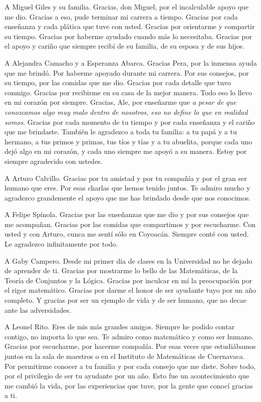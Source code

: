 A Miguel Giles y su familia. Gracias, don Miguel, por el incalculable apoyo que me dio. Gracias a eso, pude terminar mi carrera a tiempo. Gracias por cada enseñanza y cada plática que tuve con usted. Gracias por orientarme y compartir su tiempo. Gracias por haberme ayudado cuando más lo necesitaba. Gracias por el apoyo y cariño que siempre recibí de su familia, de su esposa y de sus hijos.


A Alejandra Camacho y a Esperanza Abarca. Gracias Pera, por la inmensa ayuda que me brindó. Por haberme apoyado durante mi carrera. Por sus consejos, por su tiempo, por las comidas que me dio. Gracias por cada detalle que tuvo conmigo. Gracias por recibirme en su casa de la mejor manera. Todo eso lo llevo en mi corazón por siempre. Gracias, Ale, por enseñarme que \textit{a pesar de que conozcamos algo muy malo dentro de nosotros, eso no define lo que en realidad somos}. Gracias por cada momento de tu tiempo y por cada enseñanza y el cariño que me brindaste. También le agradezco a toda tu familia: a tu papá y a tu hermano, a tus primos y primas, tus tíos y tías y a tu abuelita, porque cada uno dejó algo en mi corazón, y cada uno siempre me apoyó a su manera. Estoy por siempre agradecido con ustedes. 


A Arturo Calvillo. Gracias por tu amistad y por tu compañía y por el gran ser humano que eres. Por esas charlas que hemos tenido juntos. Te admiro mucho y agradezco grandemente el apoyo que me has brindado desde que nos conocimos.


A Felipe Spínola. Gracias por las enseñanzas que me dio y por sus consejos que me acompañan. Gracias por las comidas que compartimos y por escucharme. Con usted y con Arturo, cunca me sentí sólo en Coyoacán. Siempre conté con usted. Le agradezco infinitamente por todo.


A Gaby Campero. Desde mi primer día de clases en la Universidad no he dejado de aprender de ti. Gracias por mostrarme lo bello de las Matemáticas, de la Teoría de Conjuntos y la Lógica.  Gracias por inculcar en mí la preocupación por el rigor matemático. Gracias por darme el honor de ser ayudante tuyo por un año completo. Y gracias por ser un ejemplo de vida y de ser humano, que no decae ante las adversidades. 


A Leonel Rito. Eres de mis más grandes amigos. Siempre he podido contar contigo, no importa lo que sea. Te admiro como matemático y como ser humano. Gracias por escucharme, por hacerme compañía. Por esas veces que estudiábamos juntos en la sala de maestros o en el Instituto de Matemáticas de Cuernavaca. Por permitirme conocer a tu familia y por cada consejo que me diste. Sobre todo, por el privilegio de ser tu ayudante por un año. Esto fue un acontecimiento que me cambió la vida, por las experiencias que tuve, por la gente que conocí gracias a ti.   



